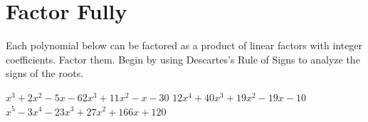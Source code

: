 \section*{Factor Fully}
Each polynomial below can be factored as a product of linear factors with integer coefficients. Factor them. Begin by using Descartes's Rule of Signs to analyze the signs of the roots.
\begin{smenum}
\mitemxx
{$x^3+2x^2-5x-6$}{$2x^3+11x^2-x-30$}
\mitemxx
{$12x^4+40x^3+19x^2-19x-10$}{$x^5-3x^4-23x^3+27x^2+166x+120$}
\end{smenum}

